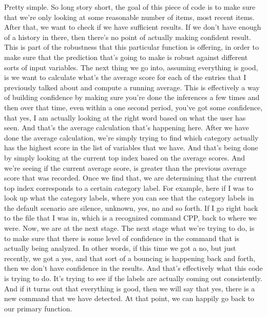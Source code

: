     Pretty simple.
    So long story short, the goal of this piece of code
    is to make sure that we're only looking at some reasonable number of items,
    most recent items.
    After that, we want to check if we have sufficient results.
    If we don't have enough of a history in there,
    then there's no point of actually making confident result.
    This is part of the robustness that this particular function
    is offering, in order to make sure that the prediction that's going to make
    is robust against different sorts of input variables.
    The next thing we go into, assuming everything is good,
    is we want to calculate what's the average score for each of the entries
    that I previously talked about and compute a running average.
    This is effectively a way of building confidence
    by making sure you're done the inferences a few times and then
    over that time, even within a one second period,
    you've got some confidence, that yes, I am actually looking at the right word
    based on what the user has seen.
    And that's the average calculation that's happening here.
    After we have done the average calculation,
    we're simply trying to find which category actually
    has the highest score in the list of variables that we have.
    And that's being done by simply looking at the current top index based
    on the average scores.
    And we're seeing if the current average score,
    is greater than the previous average score that was recorded.
    Once we find that, we are determining that the current top index corresponds
    to a certain category label.
    For example, here if I was to look up what the category labels, where
    you can see that the category labels in the default scenario
    are silence, unknown, yes, no and so forth.
    If I go right back to the file that I was in, which is a recognized command
    CPP, back to where we were.
    Now, we are at the next stage.
    The next stage what we're trying to do, is
    to make sure that there is some level of confidence in the command that
    is actually being analyzed.
    In other words, if this time we got a no, but just recently, we got a yes,
    and that sort of a bouncing is happening back and forth,
    then we don't have confidence in the results.
    And that's effectively what this code is trying to do.
    It's trying to see if the labels are actually coming out consistently.
    And if it turns out that everything is good,
    then we will say that yes, there is a new command that we have detected.
    At that point, we can happily go back to our primary function.

